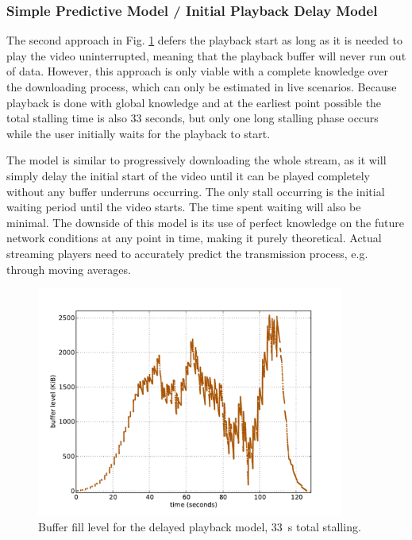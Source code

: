 








\subsubsection{Simple Predictive Model / Initial Playback Delay Model}

The second approach in Fig. \ref{c3:fig:bufferlevel-startdelay} defers the playback start as long as it is needed to play the video uninterrupted, meaning that the playback buffer will never run out of data. However, this approach is only viable with a complete knowledge over the downloading process, which can only be estimated in live scenarios. Because playback is done with global knowledge and at the earliest point possible the total stalling time is also 33 seconds, but only one long stalling phase occurs while the user initially waits for the playback to start.

The model is similar to progressively downloading the whole stream, as it will simply delay the initial start of the video until it can be played completely without any buffer underruns occurring. The only stall occurring is the initial waiting period until the video starts. The time spent waiting will also be minimal. The downside of this model is its use of perfect knowledge on the future network conditions at any point in time, making it purely theoretical. Actual streaming players need to accurately predict the transmission process, e.g. through moving averages.

\begin{figure}[htb]
    \centering
    \includegraphics[width=0.9\textwidth]{images/bufferlevel-startdelay-new.pdf}
    \caption{Buffer fill level for the delayed playback model, \SI{33}{\second} total stalling.}
    \label{c3:fig:bufferlevel-startdelay}
\end{figure}



